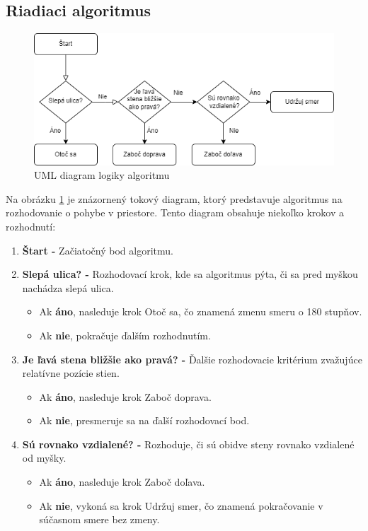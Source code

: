 \subsection{Riadiaci algoritmus}
\begin{figure}[!htpb]
    \centering
    \includegraphics[width=1\linewidth]{includes//images/uml_algo.png}
    \caption{UML diagram logiky algoritmu }
    \label{fig:uml_algo}
\end{figure}
Na obrázku \ref{fig:uml_algo} je znázornený tokový diagram, ktorý predstavuje algoritmus na rozhodovanie o pohybe v priestore. Tento diagram obsahuje niekoľko krokov a rozhodnutí:
\begin{enumerate}
    \item \textbf{Štart - }Začiatočný bod algoritmu.
    \item \textbf{Slepá ulica? - }Rozhodovací krok, kde sa algoritmus pýta, či sa pred myškou nachádza slepá ulica.
        \begin{itemize}
            \item Ak \textbf{áno}, nasleduje krok Otoč sa, čo znamená zmenu smeru o 180 stupňov.
            \item Ak \textbf{nie}, pokračuje ďalším rozhodnutím.
        \end{itemize}
    \item \textbf{Je ľavá stena bližšie ako pravá? - }Ďalšie rozhodovacie kritérium zvažujúce relatívne pozície stien.
        \begin{itemize}
            \item Ak \textbf{áno}, nasleduje krok Zaboč doprava.
            \item Ak \textbf{nie}, presmeruje sa na ďalší rozhodovací bod.
        \end{itemize}
    \item \textbf{Sú rovnako vzdialené? - }Rozhoduje, či sú obidve steny rovnako vzdialené od myšky.
        \begin{itemize}
            \item Ak \textbf{áno}, nasleduje krok Zaboč doľava.
            \item Ak \textbf{nie}, vykoná sa krok Udržuj smer, čo znamená pokračovanie v súčasnom smere bez zmeny.
        \end{itemize}
\end{enumerate}

